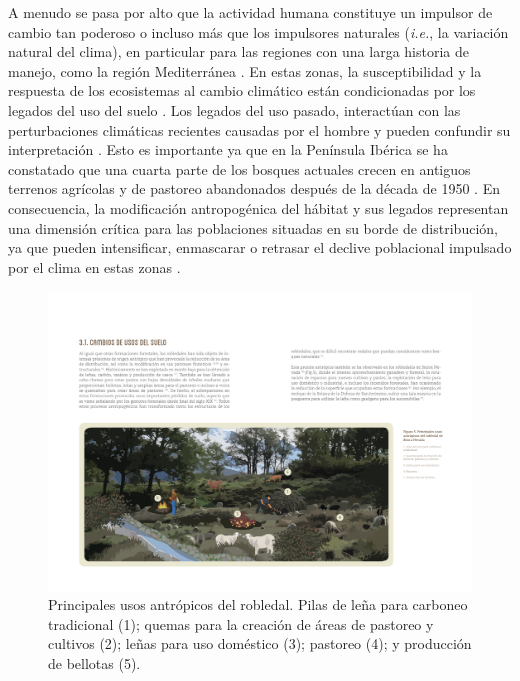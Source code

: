 A menudo se pasa por alto que la actividad humana constituye un impulsor de cambio tan poderoso o incluso más que los impulsores naturales (\emph{i.e.}, la variación natural del clima), en particular para las regiones con una larga historia de manejo, como la región Mediterránea \autocites{NavarroGonzalezetal2013WeightLanduse,DoblasMirandaetal2017ReviewCombination}. En estas zonas, la susceptibilidad y la respuesta de los ecosistemas al cambio climático están condicionadas por los legados del uso del suelo \autocites{Munteanuetal2015Legacies19th,Mausolfetal2018LegacyEffects}. Los legados del uso pasado, interactúan con las perturbaciones climáticas recientes causadas por el hombre y pueden confundir su interpretación \autocite{Fosteretal2003ImportanceLanduse}. Esto es importante ya que en la Península Ibérica se ha constatado que una cuarta parte de los bosques actuales crecen en antiguos terrenos agrícolas y de pastoreo abandonados después de la década de 1950 \autocite{VilaCabreraetal2017NewForests}. En consecuencia, la modificación antropogénica del hábitat y sus legados representan una dimensión crítica para las poblaciones situadas en su borde de distribución, ya que pueden intensificar, enmascarar o retrasar el declive poblacional impulsado por el clima en estas zonas \autocites{VilaCabreraJump2019GreaterGrowth,SanchezdeDiosetal2020FagusSylvatica}. 
\begin{figure}[H]
	\centering
	\includegraphics[width=\textwidth]{img/intro/intro-usos.pdf} \caption{Principales usos antrópicos del robledal. Pilas de leña para carboneo tradicional (1); quemas para la creación de áreas de pastoreo y cultivos (2); leñas para uso doméstico (3); pastoreo (4); y producción de bellotas (5). \autocite[Fuente: ][]{PerezLuqueetal2021ManualGestion}}\label{fig:intro:usos}
\end{figure}

